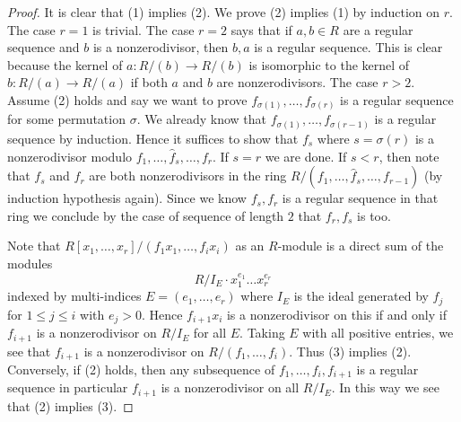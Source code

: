 \documentclass[10pt,a4paper]{amsart}
\theoremstyle{plain}
\theoremstyle{definition}
\theoremstyle{remark}
\numberwithin{equation}{subsection}
\begin{document}
\begin{proof}
It is clear that (1) implies (2). We prove (2) implies (1) by induction
on $r$. The case $r = 1$ is trivial. The case $r = 2$ says that if
$a, b \in R$ are a regular sequence and $b$ is a nonzerodivisor, then
$b, a$ is a regular sequence. This is clear because the kernel of
$a : R/(b) \to R/(b)$ is isomorphic to the kernel of $b : R/(a) \to R/(a)$
if both $a$ and $b$ are nonzerodivisors. The case $r > 2$. Assume
(2) holds and say we want to prove $f_{\sigma(1)}, \ldots, f_{\sigma(r)}$
is a regular sequence for some permutation $\sigma$. We already know
that $f_{\sigma(1)}, \ldots, f_{\sigma(r - 1)}$ is a regular sequence
by induction. Hence it suffices to show that $f_s$ where $s = \sigma(r)$
is a nonzerodivisor modulo $f_1, \ldots, \hat f_s, \ldots, f_r$.
If $s = r$ we are done. If $s < r$, then note that $f_s$ and $f_r$
are both nonzerodivisors in the ring
$R/(f_1, \ldots, \hat f_s, \ldots, f_{r - 1})$
(by induction hypothesis again). Since we know $f_s, f_r$ is a
regular sequence in that ring we conclude by the case of sequence of length
$2$ that $f_r, f_s$ is too.

\medskip\noindent
Note that $R[x_1, \ldots, x_r]/(f_1x_1, \ldots, f_ix_i)$ as an $R$-module
is a direct sum of the modules
$$
R/I_E \cdot x_1^{e_1} \ldots x_r^{e_r}
$$
indexed by multi-indices $E = (e_1, \ldots, e_r)$ where
$I_E$ is the ideal generated by $f_j$ for $1 \leq j \leq i$
with $e_j > 0$. Hence $f_{i + 1}x_i$ is a nonzerodivisor on this if
and only if $f_{i + 1}$ is a nonzerodivisor on $R/I_E$ for all $E$.
Taking $E$ with all positive entries, we see that $f_{i + 1}$
is a nonzerodivisor on $R/(f_1, \ldots, f_i)$. Thus (3) implies (2).
Conversely, if (2) holds, then any subsequence of
$f_1, \ldots, f_i, f_{i + 1}$ is a regular sequence
in particular $f_{i + 1}$ is a nonzerodivisor on all $R/I_E$.
In this way we see that (2) implies (3).
\end{proof}
\end{document}
